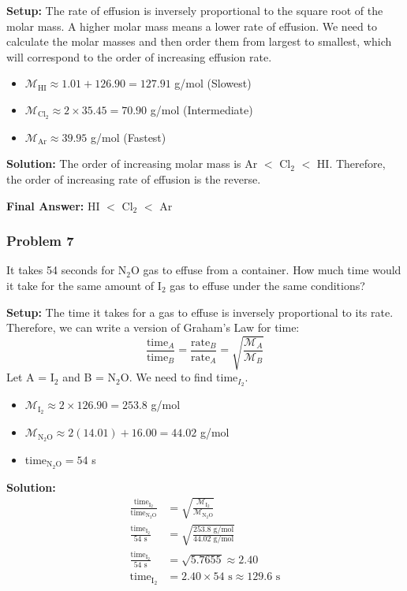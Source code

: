 \documentclass{article}
\begin{document}
\textbf{Setup:}
The rate of effusion is inversely proportional to the square root of the molar mass. A higher molar mass means a lower rate of effusion. We need to calculate the molar masses and then order them from largest to smallest, which will correspond to the order of increasing effusion rate.
\begin{itemize}
    \item $\mathcal{M}_{\text{HI}} \approx 1.01 + 126.90 = 127.91$ g/mol (Slowest)
    \item $\mathcal{M}_{\text{Cl}_2} \approx 2 \times 35.45 = 70.90$ g/mol (Intermediate)
    \item $\mathcal{M}_{\text{Ar}} \approx 39.95$ g/mol (Fastest)
\end{itemize}

\textbf{Solution:}
The order of increasing molar mass is Ar $<$ Cl$_2$ $<$ HI.
Therefore, the order of increasing rate of effusion is the reverse.

\textbf{Final Answer:} HI $<$ Cl$_2$ $<$ Ar

\subsubsection{Problem 7}
It takes 54 seconds for N$_2$O gas to effuse from a container. How much time would it take for the same amount of I$_2$ gas to effuse under the same conditions?

\textbf{Setup:}
The time it takes for a gas to effuse is inversely proportional to its rate. Therefore, we can write a version of Graham's Law for time:
\[ \frac{\text{time}_A}{\text{time}_B} = \frac{\text{rate}_B}{\text{rate}_A} = \sqrt{\frac{\mathcal{M}_A}{\mathcal{M}_B}} \]
Let A = I$_2$ and B = N$_2$O. We need to find time$_{I_2}$.
\begin{itemize}
    \item $\mathcal{M}_{\text{I}_2} \approx 2 \times 126.90 = 253.8$ g/mol
    \item $\mathcal{M}_{\text{N}_2\text{O}} \approx 2(14.01) + 16.00 = 44.02$ g/mol
    \item time$_{\text{N}_2\text{O}} = 54$ s
\end{itemize}

\textbf{Solution:}
\begin{align*}
    \frac{\text{time}_{\text{I}_2}}{\text{time}_{\text{N}_2\text{O}}} &= \sqrt{\frac{\mathcal{M}_{\text{I}_2}}{\mathcal{M}_{\text{N}_2\text{O}}}} \\
    \frac{\text{time}_{\text{I}_2}}{54 \text{ s}} &= \sqrt{\frac{253.8 \text{ g/mol}}{44.02 \text{ g/mol}}} \\
    \frac{\text{time}_{\text{I}_2}}{54 \text{ s}} &= \sqrt{5.7655} \approx 2.40 \\
    \text{time}_{\text{I}_2} &= 2.40 \times 54 \text{ s} \approx 129.6 \text{ s}
\end{align*}
\end{document}
